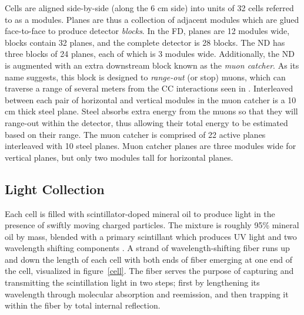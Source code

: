 Cells are aligned side-by-side (along the 6 cm side) into units of 32 cells referred to as a modules.  Planes are thus a collection of adjacent modules which are glued face-to-face to produce detector \textit{blocks}.  In the FD, planes are 12 modules wide, blocks contain 32 planes, and the complete detector is 28 blocks.  The ND has three blocks of 24 planes, each of which is 3 modules wide.  Additionally, the ND is augmented with an extra downstream block known as the \textit{muon catcher}.  As its name suggests, this block is designed to
\textit{range-out} (or stop) muons, which can traverse a range of several
meters from the \numu CC interactions seen  in \nova.
Interleaved between each pair of horizontal and vertical modules in the muon catcher is a 10 cm thick steel plane.
Steel absorbs extra energy from the muons so that they will range-out within the detector, thus allowing their total energy to be estimated based on their
range.
The muon catcher is comprised of 22 active planes interleaved with 10 steel
planes.
Muon catcher planes are three modules wide for vertical planes, but only two modules tall for horizontal planes.


\subsection{Light Collection}

Each cell is filled with scintillator-doped mineral oil to produce light in the presence of swiftly moving charged particles.  The mixture is roughly 95\% mineral oil by mass, blended with a primary scintillant which produces UV light and two wavelength shifting components \cite{mufson2015liquid}.  A strand of wavelength-shifting fiber runs up and down the length of each cell with both ends of fiber emerging at one end of the cell, visualized in figure~\ref{cell}.  The fiber serves the purpose of capturing and transmitting the scintillation light in two steps; first by lengthening its wavelength through molecular absorption and reemission, and then trapping it within the fiber by total internal reflection.

